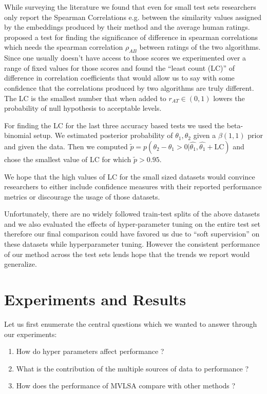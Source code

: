 \documentclass[11pt]{article}
\begin{document}
While surveying the literature we found that even for small test sets researchers only report the Spearman Correlations e.g. \cite{hill2014not,faruqui2014improving,faruqui2014retrofitting} between the similarity values assigned by the embeddings produced by their method and the
average human ratings.  proposed a test for finding the significance of difference in spearman correlations which needs the spearman correlation $\rho_{AB}$ between ratings of the two algorithms. Since one usually doesn't have access to
those scores  we experimented over a range of fixed values for those
scores and found the ``least count (LC)'' of difference in correlation coefficients that would allow us to say with
some confidence that the correlations produced by two algorithms are
truly different. The LC is the smallest number that 
when added to $r_{AT} \in (0, 1)$ lowers the probability of null
hypothesis to acceptable levels.

For finding the LC for the last three accuracy based tests we
used the beta-binomial setup.  We estimated posterior
probability of $\theta_1, \theta_2$ given a $\beta(1,1)$ prior and
given the data. Then we computed $\tilde{p} = p(\theta_2 - \theta_1 >
0 | \hat{\theta_1}, \hat{\theta_1} + \textrm{LC})$ and chose
the smallest value of LC for which $\tilde{p} > 0.95$.

We hope that
the high values of LC for the small sized datasets would convince
researchers to either include confidence measures with their reported
performance metrics or discourage the usage of those datasets.

Unfortunately, there are no widely followed train-test splits of the above
datasets and we also evaluated the effects of hyper-parameter tuning
on the entire test set therefore our final comparison could have
favored us due to ``soft supervision'' on these datasets while
hyperparameter tuning. However the consistent performance of our
method across the test sets lends hope that the trends we report would
generalize. 

\section{Experiments and Results}
\label{sec:exp}
Let us first enumerate the central questions which we wanted to answer through
our experiments: 
\begin{enumerate}[leftmargin=*]
  \itemsep-0.1em 
\item How do hyper parameters affect performance ?
\item What is the contribution of the multiple sources of data to performance ?
\item How does the performance of MVLSA compare with other methods ?
\end{enumerate}
\end{document}
